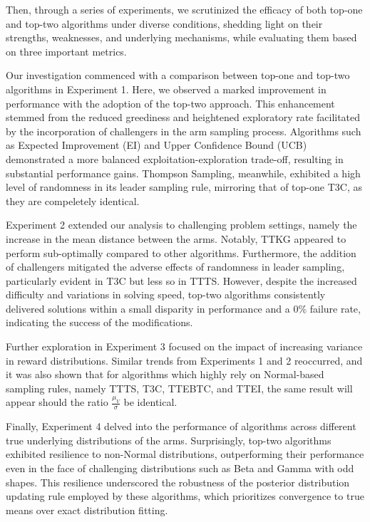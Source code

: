 \documentclass[a4paper, 12pt]{article}
\theoremstyle{definition}
\begin{document}
Then, through a series of experiments, we scrutinized the efficacy of both top-one and top-two algorithms under diverse conditions, shedding light on their strengths, weaknesses, and underlying mechanisms, while evaluating them based on three important metrics.

Our investigation commenced with a comparison between top-one and top-two algorithms in Experiment 1. Here, we observed a marked improvement in performance with the adoption of the top-two approach. This enhancement stemmed from the reduced greediness and heightened exploratory rate facilitated by the incorporation of challengers in the arm sampling process. Algorithms such as Expected Improvement (EI) and Upper Confidence Bound (UCB) demonstrated a more balanced exploitation-exploration trade-off, resulting in substantial performance gains. Thompson Sampling, meanwhile, exhibited a high level of randomness in its leader sampling rule, mirroring that of top-one T3C, as they are compeletely identical.

Experiment 2 extended our analysis to challenging problem settings, namely the increase in the mean distance between the arms. Notably, TTKG appeared to perform sub-optimally compared to other algorithms. Furthermore, the addition of challengers mitigated the adverse effects of randomness in leader sampling, particularly evident in T3C but less so in TTTS. However, despite the increased difficulty and variations in solving speed, top-two algorithms consistently delivered solutions within a small disparity in performance and a 0\% failure rate, indicating the success of the modifications.

Further exploration in Experiment 3 focused on the impact of increasing variance in reward distributions. Similar trends from Experiments 1 and 2 reoccurred, and it was also shown that for algorithms which highly rely on Normal-based sampling rules, namely TTTS, T3C, TTEBTC, and TTEI, the same result will appear should the ratio $\frac{\mu_V}{\sigma}$ be identical.

Finally, Experiment 4 delved into the performance of algorithms across different true underlying distributions of the arms. Surprisingly, top-two algorithms exhibited resilience to non-Normal distributions, outperforming their performance even in the face of challenging distributions such as Beta and Gamma with odd shapes. This resilience underscored the robustness of the posterior distribution updating rule employed by these algorithms, which prioritizes convergence to true means over exact distribution fitting.
\end{document}
